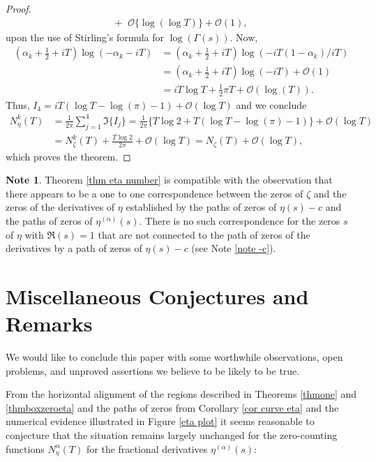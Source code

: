 \documentclass{amsart}
\theoremstyle{plain}
\theoremstyle{definition}
\newtheorem{note}[theorem]{Note}
\newcommand{\etalpha}{\eta^{(\alpha)}}
\begin{document}
\begin{proof}
\begin{align*}
    +\;\;\mathcal{O}\{\log(\log T)\}+\mathcal{O}(1),
\end{align*}
upon the use of Stirling's formula for $\log(\Gamma(s))$. Now, 
\begin{align*}
    (\alpha_k+\frac{1}{2}+iT)\log(-\alpha_k-iT)&=(\alpha_k+\frac{1}{2}+iT)\log(-iT(1-\alpha_k)/iT)\\
    &=(\alpha_k+\frac{1}{2}+iT)\log(-iT)+\mathcal{O}(1)\\
    &=iT\log T +\frac{1}{2}\pi T +\mathcal{O}(\log(T)).
\end{align*}
Thus, \(I_4 = iT(\log T-\log(\pi)-1)+\mathcal{O}(\log T)\) and we conclude 
\begin{align*}
    N^{k}_{\eta}(T) &= \frac{1}{2\pi}\sum_{j=1}^4\Im\{I_j\} =\frac{1}{2\pi}\{T\log 2+T(\log T-\log(\pi)-1)\}+\mathcal{O}(\log T)\\
    &=N^{k}_{\zeta}(T)+\frac{T\log 2}{2\pi}+\mathcal{O}(\log T) =N_{\zeta}(T)+\mathcal{O}(\log T),
\end{align*} 
which proves the theorem.
\end{proof} 

\begin{note}
Theorem \ref{thm eta number} is compatible with the observation that there appears to be a one to one correspondence between the zeros of \(\zeta\) and the zeros of the derivatives of \(\eta\) established by the
paths of zeros of \(\eta(s)-c\) and the paths of zeros of \(\etalpha(s)\).  There is no such correspondence
for the zeros \(s\) of \(\eta\) with \(\Re(s)=1\) that are not connected to the path of zeros of the derivatives by
a path of zeros of \(\eta(s)-c\) (see Note \ref{note -c}).
\end{note}





\section{Miscellaneous Conjectures and Remarks}\label{sec eta conjecture}

We would like to conclude this paper with some worthwhile observations, open problems, and unproved assertions we believe to be likely to be true.

From the horizontal alignment of the regions described in Theorems \ref{thmone} and \ref{thmboxzeroeta} 
and the paths of zeros from Corollary \ref{cor curve eta} and the numerical evidence illustrated 
in Figure \ref{eta plot} it seems reasonable to conjecture that the situation remains largely unchanged for the zero-counting functions $N_{\eta}^{\alpha}(T)$ for the fractional derivatives $\eta^{(\alpha)}(s)$:
\end{document}
